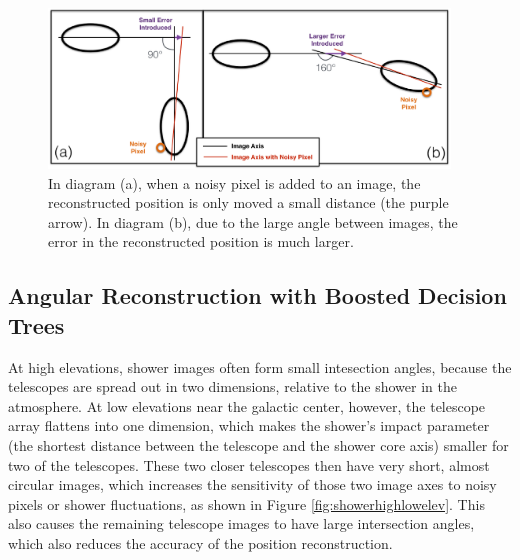   \begin{figure}[ht]
    \centering
    \includegraphics[width=0.95\textwidth]{images/large_angle_image_intersection_error_cropped.eps}
    \caption[Large Image Intersection Angles]{
      In diagram (a), when a noisy pixel is added to an image, the reconstructed position is only moved a small distance (the purple arrow).
      In diagram (b), due to the large angle between images, the error in the reconstructed position is much larger.
    }
    \label{fig:largeintersectangle}
  \end{figure}
  \FloatBarrier

  \subsection{Angular Reconstruction with Boosted Decision Trees}\label{subsec:disp}
    At high elevations, shower images often form small intesection angles, because the telescopes are spread out in two dimensions, relative to the shower in the atmosphere.
    At low elevations near the galactic center, however, the telescope array flattens into one dimension, which makes the shower's impact parameter (the shortest distance between the telescope and the shower core axis) smaller for two of the telescopes.
    These two closer telescopes then have very short, almost circular images, which increases the sensitivity of those two image axes to noisy pixels or shower fluctuations, as shown in Figure \ref{fig:showerhighlowelev}.
    This also causes the remaining telescope images to have large intersection angles, which also reduces the accuracy of the position reconstruction.

